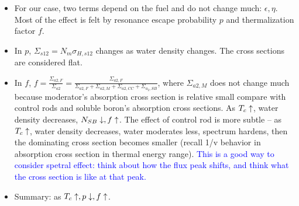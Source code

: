 \documentclass{school-22.211-notes}
\begin{document}
\begin{enumerate}
\begin{enumerate}
\begin{itemize}
      \item For our case, two terms depend on the fuel and do not change much: $\epsilon, \eta$. Most of the effect is felt by resonance escape probability $p$ and thermalization factor $f$. 

      \item In $p$, $\Sigma_{s12} = N_m \sigma_{H, s12}$ changes as water density changes. The cross sections are considered flat. 

      \item In $f$, $\displaystyle f = \frac{\Sigma_{a2,F}}{\Sigma_{a2}} = \frac{\Sigma_{a2, F}}{\Sigma_{a2,F} + \Sigma_{a2, M} + \Sigma_{a2, CC} + \Sigma_{a_2, SB}} $, where $\Sigma_{a2,M}$ does not change much because moderator's absorption cross section is relative small compare with control rods and soluble boron's absorption cross sections. As $T_c \uparrow$, water density decreases, $N_{SB} \downarrow, f \uparrow$. The effect of control rod is more subtle -- as $T_c \uparrow$, water density decreases, water moderates less, spectrum hardens, then the dominating cross section becomes smaller (recall 1/v behavior in absorption cross section in thermal energy range). \textcolor{blue}{This is a good way to consider spetral effect: think about how the flux peak shifts, and think what the cross section is like at that peak.}
        
      \item Summary: as $T_c \uparrow, p \downarrow, f \uparrow$. 
      \end{itemize}

  \end{enumerate}
\end{enumerate}
\end{document}
